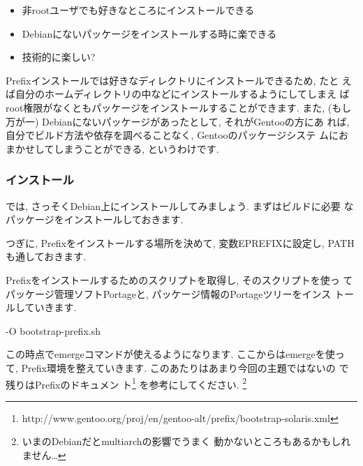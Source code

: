 \documentclass[mingoth,a4paper]{jsarticle}
\begin{document}
\begin{itemize}
\item 非rootユーザでも好きなところにインストールできる
\item Debianにないパッケージをインストールする時に楽できる
\item 技術的に楽しい?
\end{itemize}

Prefixインストールでは好きなディレクトリにインストールできるため, たと
えば自分のホームディレクトリの中などにインストールするようにしてしまえ
ばroot権限がなくともパッケージをインストールすることができます. また,
(もし万が一) Debianにないパッケージがあったとして, それがGentooの方にあ
れば, 自分でビルド方法や依存を調べることなく, Gentooのパッケージシステ
ムにおまかせしてしまうことができる, というわけです.

\subsubsection{インストール}

では, さっそくDebian上にインストールしてみましょう. まずはビルドに必要
なパッケージをインストールしておきます. 

\begin{commandline}
\end{commandline}

つぎに, Prefixをインストールする場所を決めて,  変数EPREFIXに設定し, PATHも通しておきます.

\begin{commandline}
\end{commandline}

Prefixをインストールするためのスクリプトを取得し, そのスクリプトを使っ
てパッケージ管理ソフトPortageと, パッケージ情報のPortageツリーをインス
トールしていきます. 

\begin{commandline}
  -O bootstrap-prefix.sh
\end{commandline}

この時点でemergeコマンドが使えるようになります. ここからはemergeを使っ
て, Prefix環境を整えていきます. このあたりはあまり今回の主題ではないの
で残りはPrefixのドキュメン
ト\footnote{http://www.gentoo.org/proj/en/gentoo-alt/prefix/bootstrap-solaris.xml}
を参考にしてください. \footnote{いまのDebianだとmultiarchの影響でうまく
  動かないところもあるかもしれません…}
\end{document}
